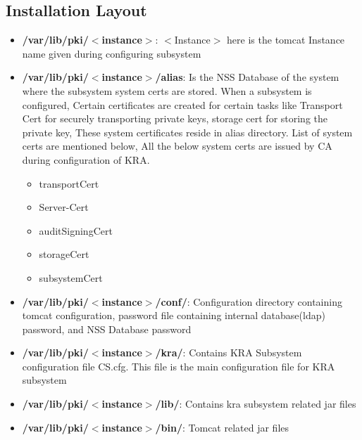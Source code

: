 \documentclass[a4paper]{article}
\begin{document}
\subsection{Installation Layout}
\begin{itemize}
    \item \textbf{/var/lib/pki/$<$instance$>$}: $<$Instance$>$ here is the tomcat Instance name 
        given during configuring subsystem
    \item \textbf{/var/lib/pki/$<$instance$>$/alias}: Is the NSS Database of the system where the subsystem system 
        certs are stored. When a subsystem is configured, Certain certificates are created for certain tasks 
        like Transport Cert for securely transporting private keys, storage cert for storing the private key, 
        These system certificates reside in alias directory. List of system certs are mentioned below, 
        All the below system certs are issued by CA during configuration of KRA.
        \begin{itemize}
            \item transportCert
            \item Server-Cert
            \item auditSigningCert
            \item storageCert
            \item subsystemCert
        \end{itemize}
    \item \textbf{/var/lib/pki/$<$instance$>$/conf/}: Configuration directory containing tomcat configuration,
        password file containing internal database(ldap) password, and NSS Database password
    \item \textbf{/var/lib/pki/$<$instance$>$/kra/}: Contains KRA Subsystem configuration file CS.cfg. This file is
        the main configuration file for KRA subsystem
    \item \textbf{/var/lib/pki/$<$instance$>$/lib/}: Contains kra subsystem related jar files 
    \item \textbf{/var/lib/pki/$<$instance$>$/bin/}: Tomcat related jar files
\end{itemize}
\end{document}
